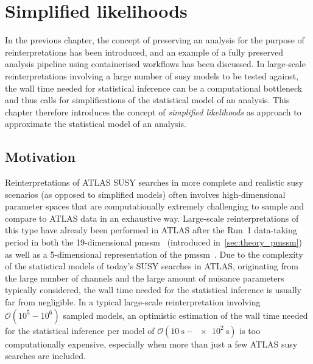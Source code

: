 
\chapter{Simplified likelihoods}\label{ch:simplify}

\ifpdf
    \graphicspath{{chapter-simplify/Figs/Raster/}{chapter-simplify/Figs/PDF/}{chapter-simplify/Figs/}}
\else
    \graphicspath{{chapter-simplify/Figs/Vector/}{chapter-simplify/Figs/}}
\fi

In the previous chapter, the concept of preserving an analysis for the purpose of reinterpretations has been introduced, and an example of a fully preserved analysis pipeline using containerised workflows has been discussed. In large-scale reinterpretations involving a large number of \gls{susy} models to be tested against, the wall time needed for statistical inference can be a computational bottleneck and thus calls for simplifications of the statistical model of an analysis. This chapter therefore introduces the concept of \textit{simplified likelihoods} as approach to approximate the statistical model of an analysis.

\section{Motivation}\label{sec:simplified_likelihood_motivation}

Reinterpretations of ATLAS SUSY searches in more complete and realistic \gls{susy} scenarios (as opposed to simplified models) often involves high-dimensional parameter spaces that are computationally extremely challenging to sample and compare to ATLAS data in an exhaustive way. Large-scale reinterpretations of this type have already been performed in ATLAS after the Run~1 data-taking period in both the 19-dimensional \gls{pmssm}~\cite{SUSY-2014-08} (introduced in~\cref{sec:theory_pmssm}) as well as a 5-dimensional representation of the \gls{pmssm}~\cite{Aaboud:2016wna}. Due to the complexity of the statistical models of today's SUSY searches in ATLAS, originating from the large number of channels and the large amount of nuisance parameters typically considered, the wall time needed for the statistical inference is usually far from negligible. In a typical large-scale reinterpretation involving $\mathcal{O}(10^5-10^6)$ sampled models, an optimistic estimation of the wall time needed for the statistical inference per model of $\mathcal{O}(\SI{10}{\second}-\SI{e2}{\second})$ is too computationally expensive, especially when more than just a few ATLAS \gls{susy} searches are included.

